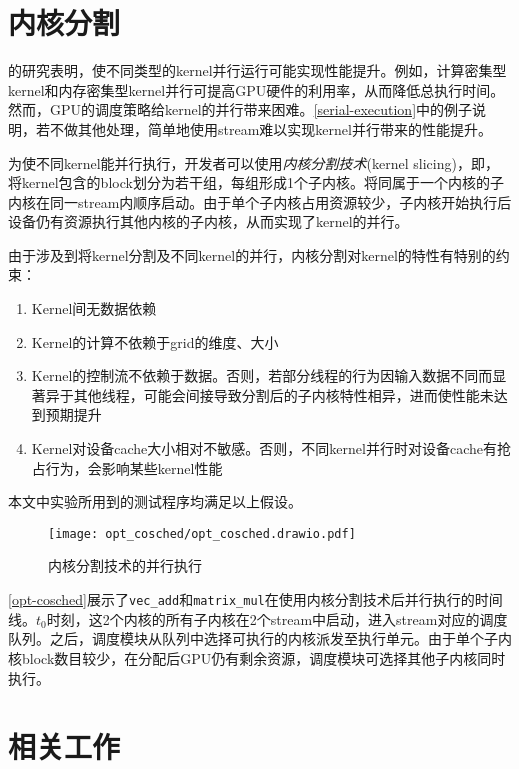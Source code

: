 \section{内核分割}

\citet{10.1145_3295690}\cite{8853389}的研究表明，使不同类型的kernel并行运行可能实现性能提升。例如，计算密集型kernel和内存密集型kernel并行可提高GPU硬件的利用率，从而降低总执行时间。然而，GPU的调度策略给kernel的并行带来困难。\autoref{serial-execution}中的例子说明，若不做其他处理，简单地使用stream难以实现kernel并行带来的性能提升。

为使不同kernel能并行执行，开发者可以使用\emph{内核分割技术}(kernel slicing)，即，将kernel包含的block划分为若干组，每组形成1个子内核。将同属于一个内核的子内核在同一stream内顺序启动。由于单个子内核占用资源较少，子内核开始执行后设备仍有资源执行其他内核的子内核，从而实现了kernel的并行。

由于涉及到将kernel分割及不同kernel的并行，内核分割对kernel的特性有特别的约束：
\begin{enumerate}
    \item Kernel间无数据依赖
    \item Kernel的计算不依赖于grid的维度、大小
    \item Kernel的控制流不依赖于数据。否则，若部分线程的行为因输入数据不同而显著异于其他线程，可能会间接导致分割后的子内核特性相异，进而使性能未达到预期提升
    \item Kernel对设备cache大小相对不敏感。否则，不同kernel并行时对设备cache有抢占行为，会影响某些kernel性能
\end{enumerate}

本文中实验所用到的测试程序均满足以上假设。

\begin{figure}[htbp]
    \centering
    \texttt{[image: opt\_cosched/opt\_cosched.drawio.pdf]}
    \caption{内核分割技术的并行执行}
    \label{opt-cosched}    
\end{figure}

\autoref{opt-cosched}展示了\texttt{vec\_add}和\texttt{matrix\_mul}在使用内核分割技术后并行执行的时间线。$t_0$时刻，这2个内核的所有子内核在2个stream中启动，进入stream对应的调度队列。之后，调度模块从队列中选择可执行的内核派发至执行单元。由于单个子内核block数目较少，在分配后GPU仍有剩余资源，调度模块可选择其他子内核同时执行。

\section{相关工作}

